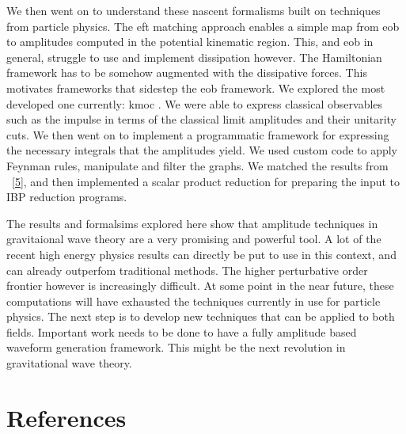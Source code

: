 \documentclass[
  10pt,
  a4paper,
  DIV=11,
  numbers=noendperiod,
  twoside]{scrreprt}
\DeclareRobustCommand{\[}{\begin{equation}}
\DeclareRobustCommand{\]}{\end{equation}}
\begin{document}
We then went on to understand these nascent formalisms built on
techniques from particle physics. The \gls{eft} matching approach
enables a simple map from \gls{eob} to amplitudes computed in the
potential kinematic region. This, and \gls{eob} in general, struggle to
use and implement dissipation however. The Hamiltonian framework has to
be somehow augmented with the dissipative forces. This motivates
frameworks that sidestep the \gls{eob} framework. We explored the most
developed one currently: \gls{kmoc} . We were able to express classical
observables such as the impulse in terms of the classical limit
amplitudes and their unitarity cuts. We then went on to implement a
programmatic framework for expressing the necessary integrals that the
amplitudes yield. We used custom code to apply Feynman rules, manipulate
and filter the graphs. We matched the results from
~{[}\protect\hyperlink{ref-Kosower:2018adc}{5}{]}, and then implemented
a scalar product reduction for preparing the input to IBP reduction
programs.

The results and formalsims explored here show that amplitude techniques
in gravitaional wave theory are a very promising and powerful tool. A
lot of the recent high energy physics results can directly be put to use
in this context, and can already outperfom traditional methods. The
higher perturbative order frontier however is increasingly difficult. At
some point in the near future, these computations will have exhausted
the techniques currently in use for particle physics. The next step is
to develop new techniques that can be applied to both fields. Important
work needs to be done to have a fully amplitude based waveform
generation framework. This might be the next revolution in gravitational
wave theory.


\hypertarget{references}{%
\chapter*{References}\label{references}}
\end{document}
